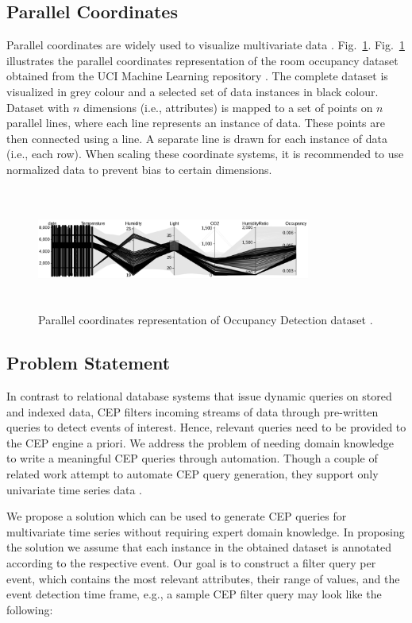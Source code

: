 \documentclass[conference]{IEEEtran}  %
\begin{document}
\subsection{Parallel Coordinates}
Parallel coordinates are widely used to visualize multivariate data \cite{IEEEexample:ParallelCoordinates}. Fig.~\ref{fig:parallcor}. Fig.~\ref{fig:parallcor} illustrates the parallel coordinates representation of the room occupancy dataset obtained from the UCI Machine Learning repository \cite{IEEEexample:Ocupancy}. The complete dataset is visualized in grey colour and a selected set of data instances in black colour. Dataset with $n$ dimensions (i.e., attributes) is mapped to a set of points on $n$ parallel lines, where each line represents an instance of data. These points are then connected using a line. A separate line is drawn for each instance of data (i.e., each row). When scaling these coordinate systems, it is recommended to use normalized data to prevent bias to certain dimensions.
\begin{figure}
\includegraphics[width=9cm,height=4cm]{occupancy_d3.png}
\caption{Parallel coordinates representation of Occupancy Detection dataset \cite{IEEEexample:Ocupancy}.}
\label{fig:parallcor}
\end{figure}

\subsection{Problem Statement} 
In contrast to relational database systems that issue dynamic queries on stored and indexed data, CEP filters incoming streams of data through pre-written queries to detect events of interest. Hence, relevant queries need to be provided to the CEP engine a priori. We address the problem of needing domain knowledge to write a meaningful CEP queries through automation. Though a couple of related work attempt to automate CEP query generation, they support only univariate time series data \cite{IEEEexample:autoCEP}.

We propose a solution which can be used to generate CEP queries for multivariate time series without requiring expert domain knowledge. In proposing the solution we assume that each instance in the obtained dataset is annotated according to the respective event. Our goal is to construct a filter query per event, which contains the most relevant attributes, their range of values, and the event detection time frame, e.g., a sample CEP filter query may look like the following:
\end{document}

